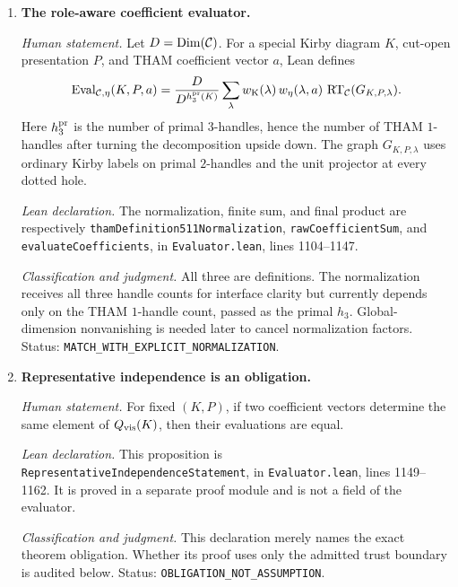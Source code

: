 \begin{enumerate}[label=\textbf{E\arabic*.},leftmargin=*]
\emph{Lean declaration.}
These are \texttt{ordinaryKirbyWeight} and \texttt{characterWeight} in
\nolinkurl{Evaluator.lean}, lines 33--48.

\emph{Classification and judgment.}
Both are definitions.  The character occurs exactly once as this scalar
weight; graphical character coupons are introduced only inside proofs that
rewrite the same scalar action.  Status: \texttt{MATCH}.

\item \textbf{The role-aware coefficient evaluator.}

\emph{Human statement.}
Let $D=\operatorname{Dim}(\mathcal{C})$.  For a special Kirby diagram $K$, cut-open
presentation $P$, and THAM coefficient vector $a$, Lean defines
\[
 \operatorname{Eval}_{\mathcal{C},\eta}(K,P,a)
 =\frac{D}{D^{h_3^{\rm pr}(K)}}
  \sum_{\lambda}
  w_{\rm K}(\lambda)\,w_\eta(\lambda,a)\,
  \operatorname{RT}_{\mathcal{C}}(G_{K,P,\lambda}).
\]
Here $h_3^{\rm pr}$ is the number of primal $3$-handles, hence the number of
THAM $1$-handles after turning the decomposition upside down.  The graph
$G_{K,P,\lambda}$ uses ordinary Kirby labels on primal $2$-handles and the
unit projector at every dotted hole.

\emph{Lean declaration.}
The normalization, finite sum, and final product are respectively
\nolinkurl{thamDefinition511Normalization}, \texttt{rawCoefficientSum}, and
\texttt{evaluateCoefficients}, in \nolinkurl{Evaluator.lean}, lines
1104--1147.

\emph{Classification and judgment.}
All three are definitions.  The normalization receives all three handle
counts for interface clarity but currently depends only on the THAM
$1$-handle count, passed as the primal $h_3$.  Global-dimension nonvanishing is
needed later to cancel normalization factors.  Status:
\nolinkurl{MATCH_WITH_EXPLICIT_NORMALIZATION}.

\item \textbf{Representative independence is an obligation.}

\emph{Human statement.}
For fixed $(K,P)$, if two coefficient vectors determine the same element of
$Q_{\rm vis}(K)$, then their evaluations are equal.

\emph{Lean declaration.}
This proposition is \nolinkurl{RepresentativeIndependenceStatement}, in
\nolinkurl{Evaluator.lean}, lines 1149--1162.  It is proved in a separate
proof module and is not a field of the evaluator.

\emph{Classification and judgment.}
This declaration merely names the exact theorem obligation.  Whether its
proof uses only the admitted trust boundary is audited below.  Status:
\nolinkurl{OBLIGATION_NOT_ASSUMPTION}.

\end{enumerate}

